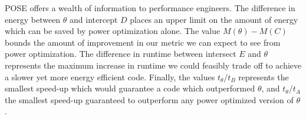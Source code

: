 POSE offers a wealth of information to performance engineers.
The difference in energy between $\theta$ and intercept $D$ places an upper limit on the amount of energy which can be saved by power optimization alone.
The value $M(\theta) - M(C)$ bounds the amount of improvement in our metric we can expect to see from power optimization.
The difference in runtime between intersect $E$ and $\theta$ represents the maximum increase in runtime we could feasibly trade off to achieve a slower yet more energy efficient code.
Finally, the values $t_\theta / t_B$ represents the smallest speed-up which would guarantee a code which outperformed $\theta$, and $t_\theta / t_A$ the smallest speed-up guaranteed to outperform any power optimized version of $\theta$.

